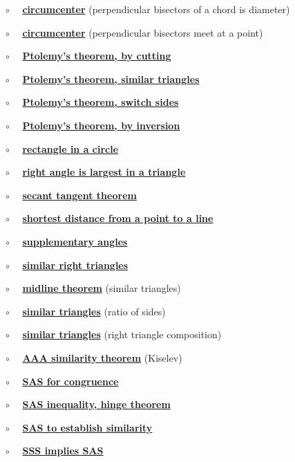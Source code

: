 \documentclass[11pt, oneside]{article}
\begin{document}
$\circ$ \ \ \hyperref[sec:perpendicular_bisector_of_a_chord]{\textbf{circumcenter}} (perpendicular bisectors of a chord is diameter)

$\circ$ \ \ \hyperref[sec:circumcenter]{\textbf{circumcenter}} (perpendicular bisectors meet at a point)

$\circ$ \ \ \hyperref[sec:Ptolemy]{\textbf{Ptolemy's theorem, by cutting}}

$\circ$ \ \ \hyperref[sec:Ptolemy_similar_triangles]{\textbf{Ptolemy's theorem, similar triangles}}

$\circ$ \ \ \hyperref[sec:Ptolemy_switch_sides]{\textbf{Ptolemy's theorem, switch sides}}

$\circ$ \ \ \hyperref[sec:Ptolemy_inversion]{\textbf{Ptolemy's theorem, by inversion}}

$\circ$ \ \ \hyperref[sec:rectangle_side_on_a_circle]{\textbf{rectangle in a circle}}

$\circ$ \ \ \hyperref[sec:right_angle_largest]{\textbf{right angle is largest in a triangle}}

$\circ$ \ \ \hyperref[sec:secant_tangent_theorem]{\textbf{secant tangent theorem}}

$\circ$ \ \ \hyperref[sec:shortest_distance_to_line]{\textbf{shortest distance from a point to a line}}

$\circ$ \ \ \hyperref[sec:equal_supplementary_angles]{\textbf{supplementary angles}}

$\circ$ \ \ \hyperref[sec:similar_right_triangles]{\textbf{similar right triangles}}

$\circ$ \ \ \hyperref[sec:midline_theorem]{\textbf{midline theorem}} (similar triangles)

$\circ$ \ \  \hyperref[sec:similarity_equal_ratios]{\textbf{similar triangles}} (ratio of sides)

$\circ$ \ \  \hyperref[sec:similarity_right_to_all_triangles]{\textbf{similar triangles}} (right triangle composition)

$\circ$ \ \ \hyperref[sec:similarity_theorem]{\textbf{AAA similarity theorem}} (Kiselev)

$\circ$ \ \ \hyperref[sec:SAS]{\textbf{SAS for congruence}}

$\circ$ \ \ \hyperref[sec:hinge_theorem]{\textbf{SAS inequality, hinge theorem}}

$\circ$ \ \ \hyperref[sec:SAS_similar]{\textbf{SAS to establish similarity}}

$\circ$ \ \ \hyperref[sec:SSS_implies_SAS]{\textbf{SSS implies SAS}}
\end{document}
